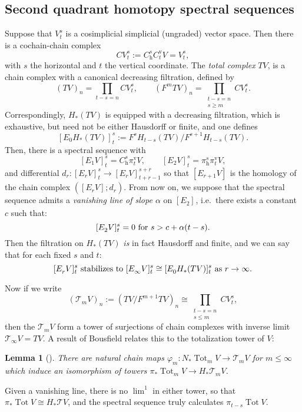 \documentclass[11pt]{amsart} \renewcommand{\baselinestretch}{1.4}
\theoremstyle{plain}
\newtheorem{lem}[thm]{Lemma}
\theoremstyle{definition}
\DeclareMathOperator{\Tot}{Tot}
\let\phi\varphi
\renewcommand{\to}{\longrightarrow}
\newcommand{\calT}{\mathcal{T}}
\newcommand{\Edownup}[5]{[E_{#1}^{#2}#3]^{#4}_{#5}}
\newcommand{\uver}{^\mathrm{v}}
\newcommand{\dhor}{_\mathrm{h}}
\begin{document}
\begin{Conventions and notation}
\subsection{Second quadrant homotopy spectral sequences}\label{Second quadrant homotopy spectral sequences}

\hfil
{}
Suppose that $V^{s}_{t}$ is a cosimplicial simplicial (ungraded) vector space. Then there is a cochain-chain complex 
\[CV^{s}_{t}:=C\dhor^{s}C\uver_{t}V=V^{s}_{t},\]
with $s$ the horizontal and $t$ the vertical coordinate. The \emph{total complex} $TV$, is a chain complex with a canonical decreasing filtration, defined by 
\[(TV)_n=\prod_{t-s=n}CV^{s}_{t},\qquad(F^mTV)_n=\prod_{\substack{t-s=n\\s\geq m}}CV^{s}_{t}.\]
Correspondingly, $H_*( TV)$ is equipped with a decreasing filtration, which is exhaustive, but need not be either Hausdorff or finite, and one defines
\[\Edownup{0}{}{H_*( TV)}{s}{t}:=F^{s}H_{t-s}( TV)/F^{s+1}   H_{t-s}( TV).\]
Then, there is a spectral sequence with
\[\Edownup{1}{}{V}{s}{t}=C\dhor^{s}\pi\uver_{t}V,\qquad\Edownup{2}{}{V}{s}{t}=\pi\dhor^{s}\pi\uver_{t}V,\]
and differential $d_r:\Edownup{r}{}{V}{s}{t}\to \Edownup{r}{}{V}{s+r}{t+r-1}$ so that $\Edownup{r+1}{}{V}{}{}$ is the homology of the chain complex $(\Edownup{r}{}{V}{}{};d_r)$. From now on, we suppose that the spectral sequence admits a \emph{vanishing line of slope $\alpha$} on $\Edownup{2}{}{}{}{}$, i.e.\ there exists a constant $c$ such that:
\[\Edownup{2}{}{V}{s}{t}=0\textup{ for }s>c+\alpha(t-s).\]
Then the filtration on $H_*( TV)$ \emph{is} in fact Hausdorff and finite, and we can say that for each fixed $s$ and $t$:
\[\Edownup{r}{}{V}{s}{t}\textup{ stabilizes to }\Edownup{\infty}{}{V}{s}{t}\cong \Edownup{0}{}{H_*( TV)}{s}{t}\textup{ as $r\rightarrow\infty$}.\]



Now if we write
\[(\calT_mV)_n:=(TV/F^{m+1} TV)_n\cong\prod_{\substack{t-s=n\\s\leq m}}CV^{s}_{t}, \]
then the $\calT_mV$ form a tower of surjections of chain complexes with inverse limit $\calT_\infty V=TV$.  A result of Bousfield relates this to the totalization tower of $V$:
\begin{lem}[{\cite[Lemma 2.2]{BousfieldHSSCS.pdf}}]
There are natural chain maps $\phi_m:N_*\Tot_mV\to \calT_mV$ for $m\leq\infty$ which induce an isomorphism of towers $\pi_*\Tot_mV\to H_*\calT_mV$.
\end{lem}
\noindent Given a vanishing line, there is no $\lim^1$ in either tower, so that $\pi_*\Tot V\cong H_*\calT V$, and the spectral sequence truly calculates $\pi_{t-s} \Tot V$.


\end{Conventions and notation}
\end{document}
